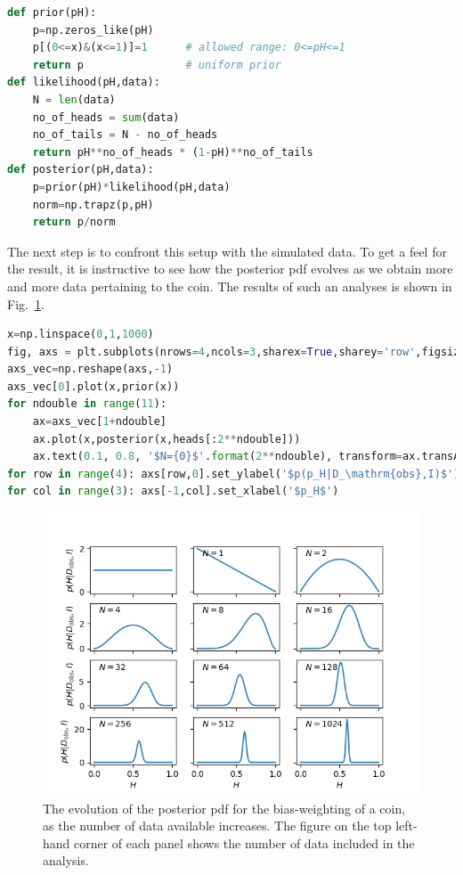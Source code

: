 \documentclass[%
oneside,                 %
final,                   %
10pt]{article}
\begin{document}
\begin{lstlisting}[language=Python,style=blue1]
def prior(pH):
    p=np.zeros_like(pH)
    p[(0<=x)&(x<=1)]=1      # allowed range: 0<=pH<=1
    return p                # uniform prior
def likelihood(pH,data):
    N = len(data)
    no_of_heads = sum(data)
    no_of_tails = N - no_of_heads
    return pH**no_of_heads * (1-pH)**no_of_tails
def posterior(pH,data):
    p=prior(pH)*likelihood(pH,data)
    norm=np.trapz(p,pH)
    return p/norm
\end{lstlisting}

The next step is to confront this setup with the simulated data. To get a feel for the result, it is instructive to see how the posterior pdf evolves as we obtain more and more data pertaining to the coin. The results of such an analyses is shown in Fig.~\ref{fig:coinflipping}. 

\begin{lstlisting}[language=Python,style=blue1]
x=np.linspace(0,1,1000)
fig, axs = plt.subplots(nrows=4,ncols=3,sharex=True,sharey='row',figsize=(14,14))
axs_vec=np.reshape(axs,-1)
axs_vec[0].plot(x,prior(x))
for ndouble in range(11):
    ax=axs_vec[1+ndouble]
    ax.plot(x,posterior(x,heads[:2**ndouble]))
    ax.text(0.1, 0.8, '$N={0}$'.format(2**ndouble), transform=ax.transAxes)
for row in range(4): axs[row,0].set_ylabel('$p(p_H|D_\mathrm{obs},I)$')
for col in range(3): axs[-1,col].set_xlabel('$p_H$')
\end{lstlisting}


\begin{figure}[!ht]  %
  \centerline{\includegraphics[width=0.95\linewidth]{fig/coinflipping_fig_1.png}}
  \caption{
  The evolution of the posterior pdf for the bias-weighting of a coin, as the number of data available increases. The figure on the top left-hand corner of each panel shows the number of data included in the analysis. \label{fig:coinflipping}
  }
\end{figure}
\end{document}
